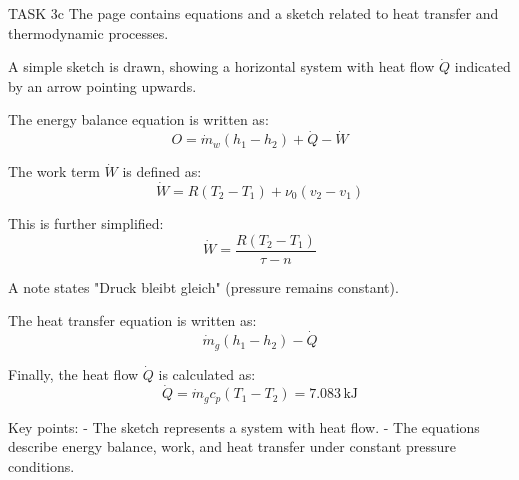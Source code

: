 TASK 3c  
The page contains equations and a sketch related to heat transfer and thermodynamic processes.  

A simple sketch is drawn, showing a horizontal system with heat flow \( \dot{Q} \) indicated by an arrow pointing upwards.  

The energy balance equation is written as:  
\[
O = \dot{m}_w (h_1 - h_2) + \dot{Q} - \dot{W}
\]  

The work term \( \dot{W} \) is defined as:  
\[
\dot{W} = R(T_2 - T_1) + \nu_0 (v_2 - v_1)
\]  

This is further simplified:  
\[
\dot{W} = \frac{R(T_2 - T_1)}{\tau - n}
\]  

A note states "Druck bleibt gleich" (pressure remains constant).  

The heat transfer equation is written as:  
\[
\dot{m}_g (h_1 - h_2) - \dot{Q}
\]  

Finally, the heat flow \( \dot{Q} \) is calculated as:  
\[
\dot{Q} = \dot{m}_g c_p (T_1 - T_2) = 7.083 \, \text{kJ}
\]  

Key points:  
- The sketch represents a system with heat flow.  
- The equations describe energy balance, work, and heat transfer under constant pressure conditions.